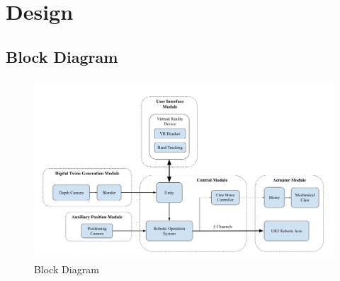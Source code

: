 \documentclass{senior-design}
\begin{document}
\chapter{Design}


\section{Block Diagram}
\begin{figure}[H]
    \centering
    \includegraphics[width=0.9\linewidth]{Block Diagram.png}
    \caption{Block Diagram}
\end{figure}
\end{document}
